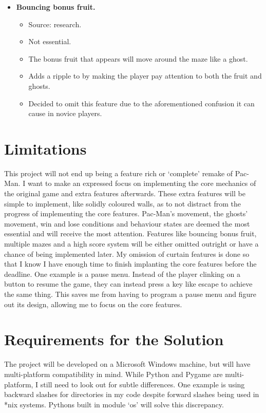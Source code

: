\documentclass[letterpaper, 11pt]{article}
\begin{document}
\begin{itemize}
\item \textbf{Bouncing bonus fruit.}
\begin{itemize}
\item Source: research.
\item Not essential.
\item The bonus fruit that appears will move around the maze like a ghost.
\item Adds a ripple to by making the player pay attention to both the fruit and ghosts.
\item Decided to omit this feature due to the aforementioned confusion it can cause in novice players.
\end{itemize}
\end{itemize}

\section{Limitations}
\label{sec:org8d89cf5}
This project will not end up being a feature rich or ‘complete’ remake of Pac-Man.
I want to make an expressed focus on implementing the core mechanics of the original game and extra features afterwards.
These extra features will be simple to implement, like solidly coloured walls, as to not distract from the progress of implementing the core features.
Pac-Man’s movement, the ghosts’ movement, win and lose conditions and behaviour states are deemed the most essential and will receive the most attention.
Features like bouncing bonus fruit, multiple mazes and a high score system will be either omitted outright or have a chance of being implemented later.
My omission of curtain features is done so that I know I have enough time to finish implanting the core features before the deadline.
One example is a pause menu.
Instead of the player clinking on a button to resume the game, they can instead press a key like escape to achieve the same thing.
This saves me from having to program a pause menu and figure out its design, allowing me to focus on the core features.

\section{Requirements for the Solution}
\label{sec:org5ac2d6e}
The project will be developed on a Microsoft Windows machine, but will have multi-platform compatibility in mind.
While Python and Pygame are multi-platform, I still need to look out for subtle differences.
One example is using backward slashes for directories in my code despite forward slashes being used in *nix systems.
Pythons built in module ‘os’ will solve this discrepancy.
\end{document}
